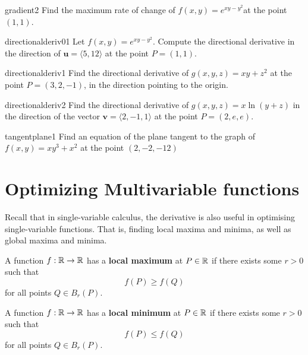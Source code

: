 \begin{problem}{gradient2}
    Find the maximum rate of change of $f(x,y) = e^{xy-y^2}$at the point $(1,1)$.
\end{problem}

\begin{problem}{directionalderiv01}
    Let $f(x,y) = e^{xy-y^2}$. Compute the directional derivative in the direction of $\bm{u} = \langle 5, 12 \rangle$ at the point $P = (1,1)$.
\end{problem}

\begin{problem}{directionalderiv1}
    Find the directional derivative of $g(x,y,z) = xy+z^2$ at the point $P = (3,2,-1)$, in the direction pointing to the origin.
\end{problem}

\begin{problem}{directionalderiv2}
    Find the directional derivative of $g(x,y,z) = x\ln(y+z)$ in the direction of the vector $\bm{v} = \langle 2, -1, 1 \rangle$ at the point $P = (2,e,e)$.
\end{problem}


\begin{problem}{tangentplane1}
    Find an equation of the plane tangent to the graph of $f(x,y) = xy^3 + x^2$ at the point $(2,-2,-12)$
\end{problem}

\section{Optimizing Multivariable functions}

Recall that in single-variable calculus, the derivative is also useful in optimising single-variable functions.  That is, finding local maxima and minima, as well as global maxima and minima.  

\begin{definition}
    A function $f: \mathbb{R} \to \mathbb{R}$ has a \textbf{local maximum} at $P \in \mathbb{R}$ if there exists some $r>0$ such that
    $$f(P) \geq f(Q)$$
    for all points $Q \in B_r(P)$.
    \end{definition}

    \begin{definition}
    A function $f: \mathbb{R} \to \mathbb{R}$ has a \textbf{local minimum} at $P \in \mathbb{R}$ if there exists some $r>0$ such that
    $$f(P) \leq f(Q)$$
    for all points $Q \in B_r(P)$.
    \end{definition}

